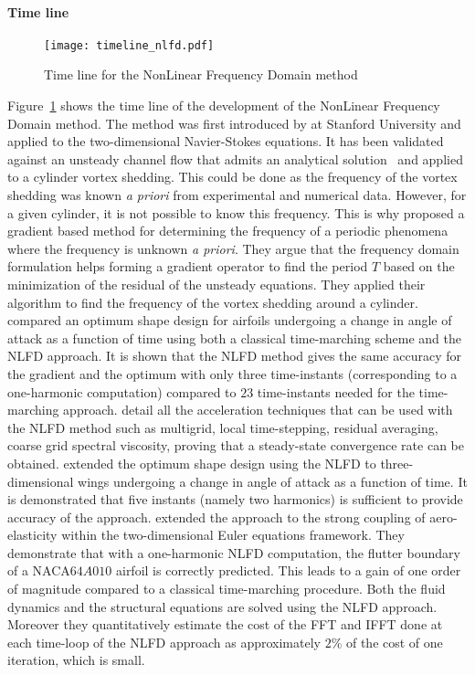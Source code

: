 \paragraph{Time line}
\begin{figure}[htbp]
  \centering
  \texttt{[image: timeline\_nlfd.pdf]}
  \caption{Time line for the NonLinear Frequency Domain method}
  \label{fig:timeline_nlfd}
\end{figure}
Figure~\ref{fig:timeline_nlfd} shows the time line of the
development of the NonLinear Frequency Domain method.
The method was first introduced by \citet{McMullen2001}
at Stanford University and applied to the two-dimensional
Navier-Stokes equations. It has been validated against an
unsteady channel flow that admits an analytical 
solution~\cite{Merkle1987} and applied to a cylinder
vortex shedding. This could be done as the frequency of the
vortex shedding was known \emph{a priori} from experimental
and numerical data. However, for a given cylinder, it is not
possible to know this frequency. This is why
 \citet{McMullen2002, McMullen2006a}
proposed a gradient based method for determining the frequency
of a periodic phenomena where the frequency is unknown
\emph{a priori}. They argue that the frequency domain formulation
helps forming a gradient operator to find the period $T$ based
on the minimization of the residual of the unsteady equations.
They applied their algorithm to find the frequency of the vortex
shedding around a cylinder.
\citet{Nadarajah2003} compared an optimum shape design for 
airfoils undergoing a change 
in angle of attack as a function of time 
using both a classical time-marching scheme
and the NLFD approach. It is shown that the NLFD method
gives the same accuracy for the gradient and the optimum with only 
three time-instants (corresponding to a one-harmonic computation)
compared to $23$ time-instants needed for 
the time-marching approach.
\citet{McMullen2006} detail all the acceleration techniques
that can be used with the NLFD method such as multigrid, local
time-stepping, residual averaging, coarse grid spectral viscosity,
proving that a steady-state convergence rate can be obtained.
\citet{Nadarajah2007} extended the optimum shape design 
using the NLFD to three-dimensional wings undergoing a change 
in angle of attack as a function of time. It is demonstrated that
five instants (namely two harmonics) is sufficient to provide
accuracy of the approach.
\citet{Kachra2008} extended the approach to the strong coupling of
aero-elasticity within the two-dimensional Euler equations framework.
They demonstrate that with a one-harmonic NLFD computation, the
flutter boundary of a NACA$64A010$ airfoil is correctly predicted.
This leads to a gain of one order of magnitude compared to a classical
time-marching procedure. Both the fluid dynamics and the structural equations
are solved using the NLFD approach. Moreover they quantitatively estimate the
cost of the FFT and IFFT done at each time-loop of the NLFD approach as
approximately $2\%$ of the cost of one iteration, which is small.


